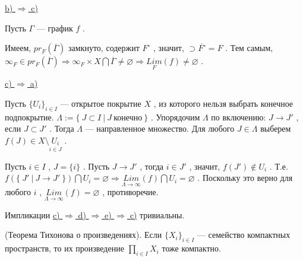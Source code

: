 \vspace

\underline{b) \( \Rightarrow \) c)}
\vspace

Пусть \( \Gamma \) --- график \( f \) .


Имеем, \( pr_F(\overline{\Gamma}) \) замкнуто, содержит \( F^{\circ} \) , значит, \( \supset \overline{F^{\circ}}=F \) . Тем самым, \( \infty_F \in pr_F(\overline{\Gamma}) \Rightarrow \infty_F\times X \bigcap \overline{\Gamma} \neq \varnothing \Rightarrow \underset{F}{Lim}(f) \neq \varnothing \) .

\vspace
\underline{c) \( \Rightarrow \) a)}
\vspace

Пусть \( \{U_i\}_{i \in I} \) --- открытое покрытие \( X \) , из которого нельзя выбрать конечное подпокрытие. \( \Lambda:=\{~J \subset I~|~J~ \text{конечно} ~\} \) . Упорядочим \( \Lambda \) по включению: \( J \rightarrow J' \) , если \( J \subset J' \) . Тогда \( \Lambda \) --- направленное множество. Для любого \( J \in \Lambda \) выберем \( f(J) \in X \setminus \underset{i \in J}{U_i} \) .

Пусть \( i \in I \) , \( J=\{i\} \) . Пусть \( J \rightarrow J' \) , тогда \( i \in J' \) , значит, \( f(J') \notin U_i \) . Т.е. \( f(\{~J'~|~J \rightarrow J'~\}) \bigcap U_i = \varnothing \Rightarrow \underset{\Lambda \rightarrow \infty}{Lim}(f) \bigcap U_i = \varnothing \) . Поскольку это верно для любого \( i \) , \( \underset{\Lambda \rightarrow \infty}{Lim}(f) = \varnothing \) , противоречие.

\vspace
Импликации \underline{c) \( \Rightarrow \) d) \( \Rightarrow \) e) \( \Rightarrow \) c)} тривиальны.

\SSendp

\SSsect[!!!] (Теорема Тихонова о произведениях).
Если \( \{X_i\}_{i \in I} \) --- семейство компактных пространств, то их произведение \( \underset{i \in I}{\prod} X_i \) тоже компактно.

\pagebreak

\SSbullet 

